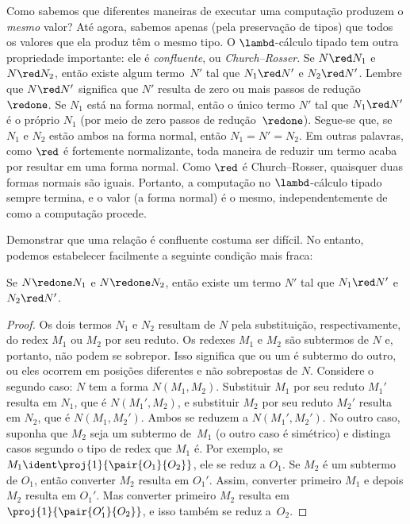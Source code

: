 \documentclass[../../../include/open-logic-section]{subfiles}
\begin{document}
Como sabemos que diferentes maneiras de executar uma computação produzem
o \emph{mesmo} valor? Até agora, sabemos apenas (pela preservação de
tipos) que todos os valores que ela produz têm o mesmo tipo. O
$\lambd$-cálculo tipado tem outra propriedade importante: ele é
\emph{confluente}, ou \emph{Church--Rosser}. Se $N \red N_1$ e $N \red
N_2$, então existe algum termo~$N'$ tal que $N_1 \red N'$ e $N_2 \red
N'$. Lembre que $N \red N'$ significa que $N'$ resulta de zero ou mais
passos de redução~$\redone$. Se $N_1$ está na forma normal, então o único
termo $N'$ tal que $N_1 \red N'$ é o próprio $N_1$ (por meio de zero
passos de redução~$\redone$). Segue-se que, se $N_1$ e $N_2$ estão ambos
na forma normal, então $N_1 = N' = N_2$. Em outras palavras, como
$\red$ é fortemente normalizante, toda maneira de reduzir um termo acaba
por resultar em uma forma normal. Como $\red$ é Church--Rosser, quaisquer
duas formas normais são iguais. Portanto, a computação no
$\lambd$-cálculo tipado sempre termina, e o valor (a forma normal) é o
mesmo, independentemente de como a computação procede.

Demonstrar que uma relação é confluente costuma ser difícil. No entanto,
podemos estabelecer facilmente a seguinte condição mais fraca:

\begin{prop}
Se $N \redone N_1$ e $N \redone N_2$, então existe um termo $N'$ tal
que $N_1 \red N'$ e $N_2 \red N'$.
\end{prop}

\begin{proof}
  Os dois termos $N_1$ e $N_2$ resultam de $N$ pela substituição,
  respectivamente, do redex $M_1$ ou $M_2$ por seu reduto. Os redexes
  $M_1$ e $M_2$ são subtermos de $N$ e, portanto, não podem se
  sobrepor. Isso significa que ou um é subtermo do outro, ou eles
  ocorrem em posições diferentes e não sobrepostas de $N$. Considere o
  segundo caso: $N$ tem a forma $N(M_1,M_2)$. Substituir $M_1$ por seu
  reduto $M_1'$ resulta em $N_1$, que é $N(M_1',M_2)$, e substituir
  $M_2$ por seu reduto $M_2'$ resulta em $N_2$, que é $N(M_1,M_2')$.
  Ambos se reduzem a $N(M_1',M_2')$. No outro caso, suponha que $M_2$
  seja um subtermo de~$M_1$ (o outro caso é simétrico) e distinga casos
  segundo o tipo de redex que $M_1$ é. Por exemplo, se $M_1 \ident
  \proj{1}{\pair{O_1}{O_2}}$, ele se reduz a $O_1$. Se $M_2$ é um
  subtermo de $O_1$, então converter $M_2$ resulta em $O_1'$. Assim,
  converter primeiro $M_1$ e depois $M_2$ resulta em $O_1'$. Mas
  converter primeiro $M_2$ resulta em $\proj{1}{\pair{O_1'}{O_2}}$, e
  isso também se reduz a~$O_2$.
\end{proof}
\end{document}
